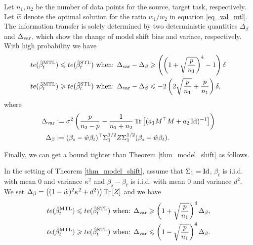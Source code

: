 \begin{theorem}\label{thm_model_shift}
	Let $n_1, n_2$ be the number of data points for the source, target task, respectively.
	Let $\hat{w}$ denote the optimal solution for the ratio $w_1/w_2$ in equation \eqref{eq_val_mtl}.
	The information transfer is solely determined by two deterministic quantities $\Delta_{\beta}$ and $\Delta_{\text{var}}$, which show the change of model shift bias and variace, respectively.
	With high probability we have
	\begin{align}
	 	te(\hat{\beta}_{t}^{\text{MTL}}) \leqslant te(\hat{\beta}_t^{\text{STL}}) \text{ when: } &\Delta_{\text{var}} - \Delta_{\beta} \geqslant \left(\left({1 + \sqrt{\frac{p} {n_1}}}\right)^4 - 1 \right) \delta \label{upper}\\
		te(\hat{\beta}_t^{\text{MTL}}) \geqslant te(\hat{\beta}_t^{\text{STL}}) \text{ when: } &\Delta_{\text{var}} - \Delta_{\beta} \leqslant -2\left({2\sqrt{\frac {p}{n_1}} + \frac{p}{n_1}}\right) \delta, \label{lower}
	\end{align}
	where
	\begin{align*} %
		\Delta_{\vari} &\define {\sigma^2}\bigbrace{\frac{p}{n_2 - p} -  \frac{1}{n_1 + n_2} \bigtr{(a_1 M^{\top}M + a_2\id)^{-1}} } \\
		\Delta_{\beta} &\define (\beta_s - \hat{w}\beta_t)^{\top} \Sigma_1^{1/2} Z \Sigma_1^{1/2} (\beta_s - \hat{w}\beta_t).
	\end{align*}
\end{theorem}


Finally, we can get a bound tighter than Theorem \ref{thm_model_shift} as follows.
\begin{lemma}\label{prop_model_shift_tight}
		In the setting of Theorem \ref{thm_model_shift}, assume that $\Sigma_1 =\operatorname{Id}$,
		$\beta_t$ is i.i.d. with mean $0$ and variance $\kappa^2$ and $\beta_s - \beta_t$ is i.i.d. with mean $0$ and variance $d^2$.
		We set $\Delta_{\beta} = \left({(1 - \hat{w})^2 \kappa^2 + d^2)}\right) \operatorname{Tr}\left[Z\right]$
		and we have
		\begin{align*}
			te(\hat{\beta}_t^{\text{MTL}}) \leqslant te(\hat{\beta}_t^{\text{STL}}) \text{ when: } & \Delta_{\text{var}} \geqslant \left({1 + \sqrt{\frac{p}{n_1}}}\right)^4 \Delta_{\beta}, \\
			te(\hat{\beta}_t^{\text{MTL}}) \geqslant te(\hat{\beta}_t^{\text{STL}}) \text{ when: } & \Delta_{\text{var}} \leqslant \left({1 - \sqrt{\frac{p}{n_1}}}\right)^4 \Delta_{\beta}.
		\end{align*}
\end{lemma}


